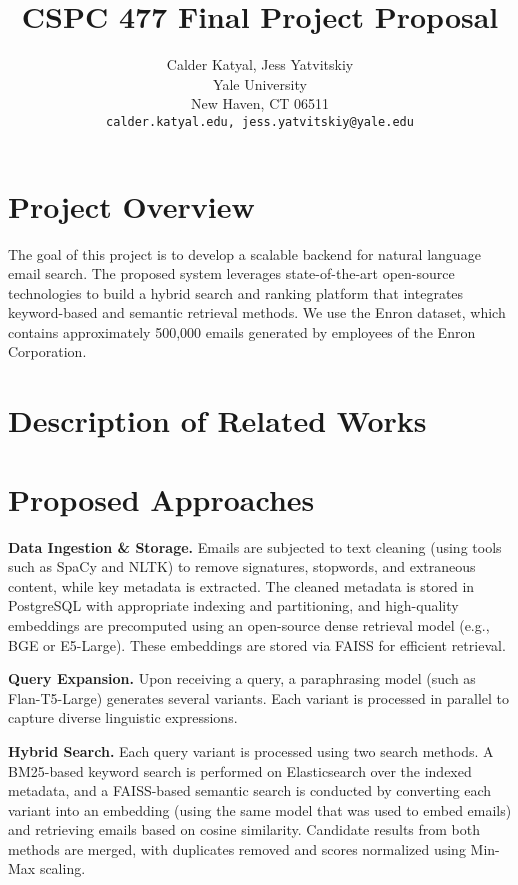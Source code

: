 \documentclass{article}
\title{CSPC 477 Final Project Proposal}
\author{%
  Calder Katyal, Jess Yatvitskiy\\
  Yale University\\
  New Haven, CT 06511 \\
  \texttt{calder.katyal.edu, jess.yatvitskiy@yale.edu} \\
}
\begin{document}
\maketitle
\vspace{-2em}
\section{Project Overview}
\label{project_overview}

The goal of this project is to develop a scalable backend for natural language email search. The proposed system leverages state-of-the-art open-source technologies to build a hybrid search and ranking platform that integrates keyword-based and semantic retrieval methods. We use the Enron dataset, which contains approximately 500,000 emails generated by employees of the Enron Corporation.
\section{Description of Related Works}
\label{related_works}

\section{Proposed Approaches}

\textbf{Data Ingestion \& Storage.} Emails are subjected to text cleaning (using tools such as SpaCy and NLTK) to remove signatures, stopwords, and extraneous content, while key metadata is extracted. The cleaned metadata is stored in PostgreSQL with appropriate indexing and partitioning, and high-quality embeddings are precomputed using an open-source dense retrieval model (e.g., BGE or E5-Large). These embeddings are stored via FAISS for efficient retrieval.

\textbf{Query Expansion.} Upon receiving a query, a paraphrasing model (such as Flan-T5-Large) generates several variants. Each variant is processed in parallel to capture diverse linguistic expressions.

\textbf{Hybrid Search.} Each query variant is processed using two search methods. A BM25-based keyword search is performed on Elasticsearch over the indexed metadata, and a FAISS-based semantic search is conducted by converting each variant into an embedding (using the same model that was used to embed emails) and retrieving emails based on cosine similarity. Candidate results from both methods are merged, with duplicates removed and scores normalized using Min-Max scaling.
\end{document}
